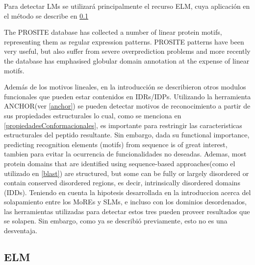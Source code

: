Para detectar LMs se utilizará principalmente el recurso ELM, cuya aplicación en el método se describe en \ref{elm}

The PROSITE database has collected a number of linear protein motifs, representing them as regular expression patterns. 
PROSITE patterns have been very useful, but also suffer from severe overprediction problems and more recently the database has emphasised globular domain annotation at the expense of linear motifs.



Además de los motivos lineales, en la introducción se describieron otros modulos funcionales que pueden estar contenidos en IDRs/IDPs.
Utilizando la herramienta ANCHOR(ver \ref{anchor}) se pueden detectar motivos de reconocimiento a partir de sus propiedades estructurales lo cual, como se menciona en \ref{propiedadesConformacionales}, es importante para restringir las 
caracteristicas estructurales del peptido resultante. Sin embargo, dada su functional importance, predicting recognition elements (motifs) from sequence is of great interest, tambien para evitar la ocurrencia de funcionalidades no deseadas.
Ademas, most protein domains that are identified using sequence-based approaches(como el utilizado en \ref{blast}) are structured, but some can be fully or largely disordered  or contain conserved disordered regions,
es decir, intrinsically disordered domains (IDDs).
Teniendo en cuenta la hipotesis desarrollada en la introduccion acerca del solapamiento entre los MoREs y SLMs, e incluso con los dominios desordenados, las herramientas utilizadas para detectar estos tres pueden proveer resultados que se solapen.
Sin embargo, como ya se describió previamente, esto no es una desventaja.




\subsection{ELM}\label{elm}


